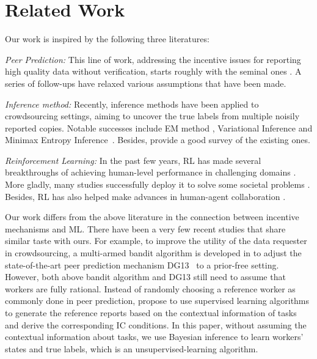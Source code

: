 \section{Related Work}
Our work is inspired by the following three literatures:

\emph{Peer Prediction:} This line of work, addressing the incentive issues for reporting high quality data without verification, starts roughly with the seminal ones \cite{prelec2004bayesian,gneiting2007strictly}. A series of follow-ups have relaxed various assumptions that have been made\cite{jurca2009mechanisms,witkowski2012peer,radanovic2013robust,dasgupta2013crowdsourced}. 

\emph{Inference method:} Recently, inference methods have been applied to crowdsourcing settings, aiming to uncover the true labels from multiple noisily reported copies. Notable successes include EM method \cite{dawid1979maximum,raykar2010learning,zhang2014spectral}, Variational Inference \cite{liu2012variational,chen2015statistical} and Minimax Entropy Inference~\cite{zhou2012learning,zhou2014aggregating}. Besides, \citet{zheng2017truth} provide a good survey of the existing ones.

\emph{Reinforcement Learning:} In the past few years, %
RL has made several breakthroughs of achieving human-level performance in challenging domains \citep{Mnih15,Hasselt2016DeepRL,Silver17}. More gladly, many studies successfully deploy it to solve some societal problems \citep{Yu2013EmotionalMR,Leibo2017}. Besides, RL has also helped make advances in human-agent collaboration \citep{Sadhu2016ArgusSH,Wang2017}.


Our work differs from the above literature in the connection between incentive mechanisms and ML. There have been a very few recent studies that share similar taste with ours.
For example, to improve the utility of the data requester in crowdsourcing, a multi-armed bandit algorithm is developed in \citet{liu2017sequential} to adjust the state-of-the-art peer prediction mechanism DG13~\cite{dasgupta2013crowdsourced} to a prior-free setting.
However, both above bandit algorithm and DG13 still need to assume that workers are fully rational.
Instead of randomly choosing a reference worker as commonly done in peer prediction, \citet{liu2017machine} propose to use supervised learning algorithms to generate the reference reports based on the contextual information of tasks and derive the corresponding IC conditions.
In this paper, without assuming the contextual information about tasks, we use Bayesian inference to learn workers' states and true labels, which is an unsupervised-learning algorithm.

